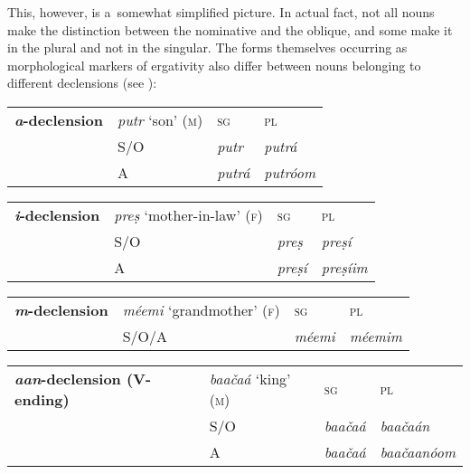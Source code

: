 This, however, is a~somewhat simplified picture. In actual fact, not all nouns make the distinction between the nominative and the oblique, and some make it in the plural and not in the singular. The forms themselves occurring as morphological markers of ergativity also differ between nouns belonging to different declensions (see ): 


\begin{table}[H]
\begin{tabularx}{\textwidth}{ | P{26mm} | P{32mm} | Q |  Q | }
\hline
\textbf{\textit{a}-declension} &
\textit{putr} `son' \textsc{(m)} &
\textsc{sg} &
\textsc{pl}\\
&
S/O &
\textit{putr} &
\textit{putrá} \\
&
A &
\textit{putrá} &
\textit{putróom}  \\\hline
\end{tabularx}
\end{table}


\begin{table}[H]
\begin{tabularx}{\textwidth}{ | P{26mm} | P{32mm} | Q | Q |}
\hline
\textbf{\textit{i}-declension} &
\textit{preṣ} `mother-in-law' \textsc{(f)} &
\textsc{sg} &
\textsc{pl}\\
&
S/O &
\textit{preṣ} &
\textit{preṣí} \\
&
A &
\textit{preṣí} &
\textit{preṣíim} \\\hline
\end{tabularx}
\end{table}

\begin{table}[H]
\begin{tabularx}{\textwidth}{ | P{26mm} | P{32mm} | Q | Q |}
\hline
\textbf{\textit{m}-declension} &
\textit{méemi} `grandmother' \textsc{(f)} &
\textsc{sg} &
\textsc{pl}\\
&
S/O/A &
\textit{méemi} &
\textit{méemim} \\\hline
\end{tabularx}
\end{table}

\begin{table}[H]
\begin{tabularx}{\textwidth}{ | P{26mm} | P{32mm} | Q | Q |}
\hline
\textbf{\textit{aan}-declension (V-ending)} &
\textit{baačaá} `king' \textsc{(m)} &
\textsc{sg} &
\textsc{pl}\\
&
S/O &
\textit{baačaá} &
\textit{baačaán} \\
&
A &
\textit{baačaá} &
\textit{baačaanóom} \\\hline
\end{tabularx}
\end{table}

